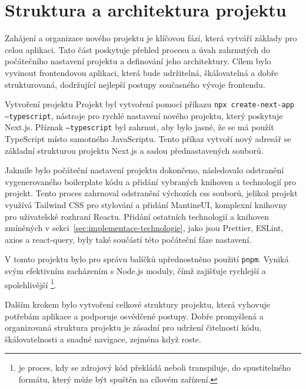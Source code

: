 \section{Struktura a architektura projektu}
\label{sec:implementace-architektura}
Zahájení a organizace nového projektu je klíčovou fází, která vytváří základy pro celou aplikaci.
Tato část poskytuje přehled procesu a úvah zahrnutých do počátečního nastavení projektu a definování jeho architektury.
Cílem bylo vyvinout frontendovou aplikaci, která bude udržitelná, škálovatelná a dobře strukturovaná, dodržující nejlepší postupy současného vývoje frontendu.

\begin{subsection}{Vytvoření projektu}
    \label{subsec:implementace-architektura-vytvoreni-projektu}
    Projekt byl vytvoření pomocí příkazu \texttt{npx create-next-app --typescript}, nástroje pro rychlé nastavení nového projektu, který poskytuje Next.js.
    Příznak \texttt{--typescript} byl zahrnut, aby bylo jasné, že se má použít TypeScript místo samotného JavaScriptu.
    Tento příkaz vytvoří nový adresář se základní strukturou projektu Next.js a sadou přednastavených souborů\cite{n_nextjs_org_docs}.

    Jakmile bylo počáteční nastavení projektu dokončeno, následovalo odstranění vygenerovaného boilerplate kódu a přidání vybraných knihoven a technologií pro projekt.
    Tento proces zahrnoval odstranění výchozích \ac{css} souborů, jelikož projekt využívá Tailwind CSS pro stylování a přidání MantineUI, komplexní knihovny pro uživatelské rozhraní Reactu.
    Přidání ostatních technologií a knihoven zmíněných v sekci~\ref{sec:implementace-technologie}, jako jsou Prettier, ESLint, axios a react-query, byly také součástí této počáteční fáze nastavení.

    V tomto projektu bylo pro správu balíčků upřednostněno použití \texttt{pnpm}.
    Vyniká svým efektivním zacházením s Node.js moduly, čímž zajišťuje rychlejší a spolehlivější \footnote{ je proces, kdy se zdrojový kód překládá neboli transpiluje, do spustitelného formátu, který může být spuštěn na cílovém zařízení.}\cite{p__pnpm_io}.

    Dalším krokem bylo vytvoření celkové struktury projektu, která vyhovuje potřebám aplikace a podporuje osvědčené postupy.
    Dobře promyšlená a organizovaná struktura projektu je zásadní pro udržení čitelnosti kódu, škálovatelnosti a snadné navigace, zejména když  roste.
\end{subsection}

